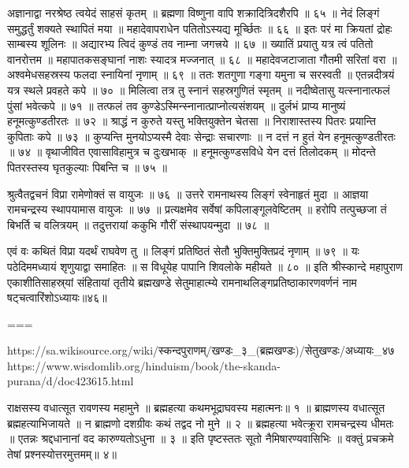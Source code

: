 अज्ञानाद्वा नरश्रेष्ठ त्वयेदं साहसं कृतम् ॥
ब्रह्मणा विष्णुना वापि शक्रादित्रिदशैरपि ॥ ६५ ॥
नेदं लिङ्गं समुद्धर्तुं शक्यते स्थापितं मया ॥
महादेवापराधेन पतितोऽस्यद्य मूर्च्छितः ॥ ६६ ॥
इतः परं मा क्रियतां द्रोहः साम्बस्य शूलिनः ॥
अद्यारभ्य त्विदं कुण्डं तव नाम्ना जगत्त्रये ॥ ६७ ॥
ख्यातिं प्रयातु यत्र त्वं पतितो वानरोत्तम ॥
महापातकसङ्घानां नाशः स्यादत्र मज्जनात् ॥ ६८ ॥
महादेवजटाजाता गौतमी सरितां वरा ॥
अश्वमेधसहस्रस्य फलदा स्नायिनां नृणाम् ॥ ६९ ॥
ततः शतगुणा गङ्गा यमुना च सरस्वती ॥
एतन्नदीत्रयं यत्र स्थले प्रवहते कपे ॥ ७० ॥
मिलित्वा तत्र तु स्नानं सहस्रगुणितं स्मृतम् ॥
नदीष्वेतासु यत्स्नानात्फलं पुंसां भवेत्कपे ॥ ७१ ॥
तत्फलं तव कुण्डेऽस्मिन्स्नानात्प्राप्नोत्यसंशयम् ॥
दुर्लभं प्राप्य मानुष्यं हनूमत्कुण्डतीरतः ॥ ७२ ॥
श्राद्धं न कुरुते यस्तु भक्तियुक्तेन चेतसा ॥
निराशास्तस्य पितरः प्रयान्ति कुपिताः कपे ॥ ७३ ॥
कुप्यन्ति मुनयोऽप्यस्मै देवाः सेन्द्राः सचारणाः ॥
न दत्तं न हुतं येन हनूमत्कुण्डतीरतः ॥ ७४ ॥
वृथाजीवित एवासाविहामुत्र च दुःखभाक् ॥
हनूमत्कुण्डसविधे येन दत्तं तिलोदकम् ॥
मोदन्ते पितरस्तस्य घृतकुल्याः पिबन्ति च ॥ ७५ ॥

श्रुत्वैतद्वचनं विप्रा रामेणोक्तं स वायुजः ॥ ७६ ॥
उत्तरे रामनाथस्य लिङ्गं स्वेनाहृतं मुदा ॥
आज्ञया रामचन्द्रस्य स्थापयामास वायुजः ॥ ७७ ॥
प्रत्यक्षमेव सर्वेषां कपिलाङ्गूलवेष्टितम् ॥
हरोपि तत्पुच्छजा तं बिभर्ति च वलित्रयम् ॥
तदुत्तरायां ककुभि गौरीं संस्थापयन्मुदा ॥ ७८ ॥

एवं वः कथितं विप्रा यदर्थं राघवेण तु ॥
लिङ्गं प्रतिष्ठितं सेतौ भुक्तिमुक्तिप्रदं नृणाम् ॥ ७९ ॥
यः पठेदिममध्यायं शृणुयाद्वा समाहितः ॥
स विधूयेह पापानि शिवलोके महीयते ॥ ८० ॥
इति श्रीस्कान्दे महापुराण एकाशीतिसाहस्र्यां संहितायां तृतीये ब्रह्मखण्डे सेतुमाहात्म्ये रामनाथलिङ्गप्रतिष्ठाकारणवर्णनं नाम षट्चत्वारिंशोऽध्यायः॥४६॥

===

https://sa.wikisource.org/wiki/स्कन्दपुराणम्/खण्डः_३_(ब्रह्मखण्डः)/सेतुखण्डः/अध्यायः_४७
https://www.wisdomlib.org/hinduism/book/the-skanda-purana/d/doc423615.html


राक्षसस्य वधात्सूत रावणस्य महामुने ॥
ब्रह्महत्या कथमभूद्राघवस्य महात्मनः॥ १ ॥
ब्राह्मणस्य वधात्सूत ब्रह्महत्याभिजायते ॥
न ब्राह्मणो दशग्रीवः कथं तद्वद नो मुने ॥ २ ॥
ब्रह्महत्या भवेत्क्रूरा रामचन्द्रस्य धीमतः ॥
एतन्नः श्रद्दधानानां वद कारुण्यतोऽधुना ॥ ३ ॥
इति पृष्टस्ततः सूतो नैमिषारण्यवासिभिः ॥
वक्तुं प्रचक्रमे तेषां प्रश्नस्योत्तरमुत्तमम्॥ ४॥


